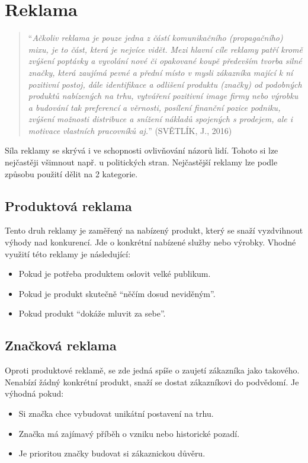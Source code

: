\section{Reklama}
    \begin{quote}
        \enquote{\emph{Ačkoliv reklama je pouze jedna z částí komunikačního (propagačního) mixu, je to část, která je nejvíce vidět.
        Mezi hlavní cíle reklamy patří kromě zvýšení poptávky a vyvolání nové či opakované koupě především tvorba silné značky,
        která zaujímá pevné a přední místo v mysli zákazníka mající k ní pozitivní postoj, dále identifikace a
        odlišení produktu (značky) od podobných produktů nabízených na trhu,
        vytváření pozitivní image firmy nebo výrobku a budování tak preferencí a věrnosti, posílení finanční pozice podniku,
        zvýšení možnosti distribuce a snížení nákladů spojených s prodejem, ale i motivace vlastních pracovníků aj.}}
        (SVĚTLÍK, J., 2016) \cite{svetlik:marketing}
    \end{quote}
    

    Síla reklamy se skrývá i ve schopnosti ovlivňování názorů lidí. Tohoto si lze nejčastěji všimnout např.
    u politických stran. Nejčastější reklamy lze podle způsobu použití dělit na 2 kategorie. \cite{marketing:product-vs-brand}

    \subsection{Produktová reklama}
    Tento druh reklamy je zaměřený na nabízený produkt, který se snaží vyzdvihnout výhody nad konkurencí.
    Jde o konkrétní nabízené služby nebo výrobky. Vhodné využití této reklamy je následující:
    \begin{itemize}
        \item Pokud je potřeba produktem oslovit velké publikum.
        \item Pokud je produkt skutečně \enquote{něčím dosud neviděným}.
        \item Pokud produkt \enquote{dokáže mluvit za sebe}.
    \end{itemize}

    \subsection{Značková reklama}
    Oproti produktové reklamě, se zde jedná spíše o zaujetí zákazníka jako takového. Nenabízí žádný konkrétní produkt,
    snaží se dostat zákazníkovi do podvědomí. Je výhodná pokud:
    \begin{itemize}
        \item Si značka chce vybudovat unikátní postavení na trhu. 
        \item Značka má zajímavý příběh o vzniku nebo historické pozadí. 
        \item Je prioritou značky budovat si zákaznickou důvěru. 
    \end{itemize}

